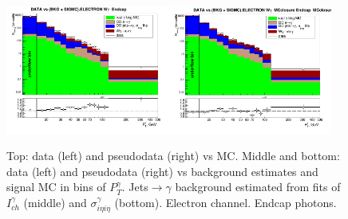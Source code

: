 \begin{figure}[htb]
\begin{center}
   \includegraphics[width=0.48\textwidth]{../figs/figs_v11/ELECTRON_WGamma/PrepareYields/c_DATAvsBkgPlusSigMCc_ELECTRON_WGamma_TEMPL_SIHIH_UNblind__Endcap__phoEt.png}\includegraphics[width=0.48\textwidth]{../figs/figs_v11/ELECTRON_WGamma/PrepareYields/c_DATAvsBkgPlusSigMCc_ELECTRON_WGamma_TEMPL_SIHIH_UNblind_MCclosure__Endcap__phoEt_MCclosure.png}
  \caption{Top: data (left) and pseudodata (right) vs MC. Middle and bottom: data (left) and pseudodata (right) vs background estimates and signal MC in bins of $P_T^{\gamma}$. Jets$\rightarrow\gamma$ background estimated from fits of $I_{ch}^{\gamma}$ (middle) and  $\sigma_{i\eta i\eta}^{\gamma}$ (bottom). Electron channel. Endcap photons.}
  \label{fig:DATAvsBKGandSIGMC_MCclosure_ELECTRON_E}
  \end{center}
\end{figure}
